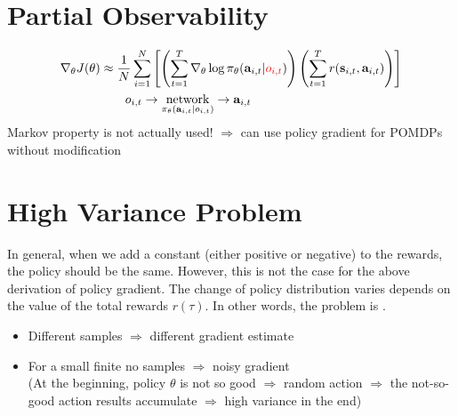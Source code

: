 \section{Partial Observability}
\begin{align*}
	\nabla_\theta J(\theta) & \approx \frac{1}{N} \sum_{i=1}^{N} \left[ \left( \sum_{t=1}^{T} \nabla_\theta\log \pi_\theta(\textbf{a}_{i,t} | {\color{red} o_{i,t}}) \right) \left( \sum_{t=1}^{T} r(\textbf{s}_{i,t}, \textbf{a}_{i,t}) \right) \right]\\
	& \qquad o_{i, t} \rightarrow \underset{\pi_\theta(\textbf{a}_{i,t} | o_{i,t})}{\text{network}} \rightarrow \textbf{a}_{i,t}
\end{align*}
Markov property is not actually used! $\Rightarrow$ can use policy gradient for \ac{POMDP}s without modification

\section{High Variance Problem}
In general, when we add a constant (either positive or negative) to the rewards, the policy should be the same. However, this is not the case for the above derivation of policy gradient. The change of policy distribution varies depends on the value of the total rewards $r(\tau)$. In other words, the problem is .
\begin{itemize}
	\item Different samples $\Rightarrow$ different gradient estimate
	\item For a small finite \ac{no} samples $\Rightarrow$ noisy gradient\\
	(At the beginning, policy $\theta$ is not so good $\Rightarrow$ random action $\Rightarrow$ the not-so-good action results accumulate $\Rightarrow$ high variance in the end)
\end{itemize}

